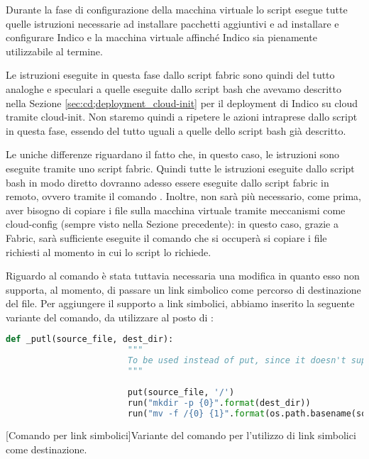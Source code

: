             Durante la fase di configurazione della macchina virtuale lo script esegue tutte quelle istruzioni necessarie ad installare pacchetti aggiuntivi e ad installare e configurare Indico e la macchina virtuale affinché Indico sia pienamente utilizzabile al termine.
            
            Le istruzioni eseguite in questa fase dallo script fabric sono quindi del tutto analoghe e speculari a quelle eseguite dallo script bash che avevamo descritto nella Sezione \ref{sec:cd;deployment_cloud-init} per il deployment di Indico su cloud tramite cloud-init. Non staremo quindi a ripetere le azioni intraprese dallo script in questa fase, essendo del tutto uguali a quelle dello script bash già descritto.
            
            Le uniche differenze riguardano il fatto che, in questo caso, le istruzioni sono eseguite tramite uno script fabric. Quindi tutte le istruzioni eseguite dallo script bash in modo diretto dovranno adesso essere eseguite dallo script fabric in remoto, ovvero tramite il comando . Inoltre, non sarà più necessario, come prima, aver bisogno di copiare i file sulla macchina virtuale tramite meccanismi come cloud-config (sempre visto nella Sezione precedente): in questo caso, grazie a Fabric, sarà sufficiente eseguite il comando  che si occuperà si copiare i file richiesti al momento in cui lo script lo richiede.
            
            Riguardo al comando  è stata tuttavia necessaria una modifica in quanto esso non supporta, al momento, di passare un link simbolico come percorso di destinazione del file. Per aggiungere il supporto a link simbolici, abbiamo inserito la seguente variante del comando, da utilizzare al posto di :
            
            \begin{center}
                \begin{lstlisting}[language=python, gobble=18]
                    def _putl(source_file, dest_dir):
                        """
                        To be used instead of put, since it doesn't support symbolic links
                        """
                    
                        put(source_file, '/')
                        run("mkdir -p {0}".format(dest_dir))
                        run("mv -f /{0} {1}".format(os.path.basename(source_file), dest_dir))
                \end{lstlisting}
                \captionsetup{textformat=empty,labelformat=empty} \vspace{-2em}
                [Comando  per link simbolici]{Variante del comando  per l'utilizzo di link simbolici come destinazione.}
            \end{center}
            
